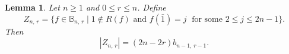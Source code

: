\documentclass[11pt]{article}
\newtheorem{lemma}[theorem]{Lemma}
\newcommand{\q}{\quad}
\newcommand{\qq}{\qquad}
\newcommand{\ges}{\geqslant}
\newcommand{\les}{\leqslant}
\begin{document}

%
\begin{lemma}\label{prop-Xnr2}
Let $n\ges 1$ and $0\les r\les n$. Define
\[
Z_{n,\,r}=\{f\in\mathbb B_{n,\,r}\mid 
1\notin R(f)\text{ and } f(\bar 1)=j \;\text{ for some $2\les j\les 2n-1$}\}.
\]
%
Then 
$$
    |Z_{n,\,r}|=(2n-2r)b_{n-1,\,r-1}.
$$
\end{lemma}
\end{document}
